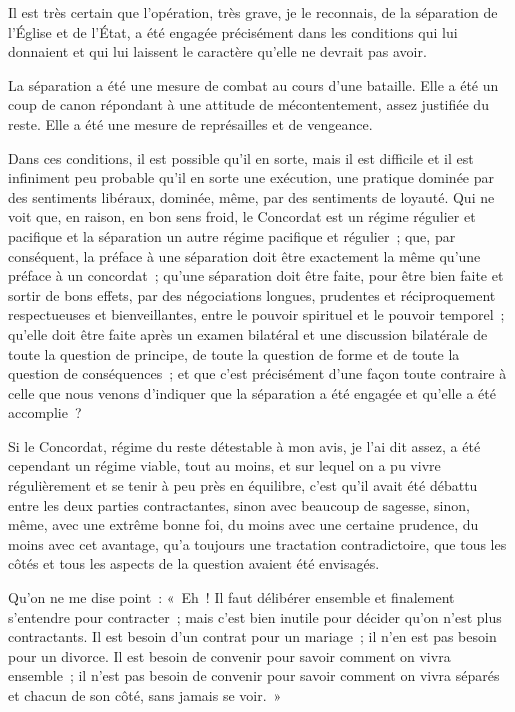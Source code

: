 \documentclass[french,twoside]{book} %
\begin{document}
Il est très certain que l’opération, très grave, je le reconnais, de la séparation de l’Église et de l’État, a été engagée précisément dans les conditions qui lui donnaient et qui lui laissent le caractère qu’elle ne devrait pas avoir.\par
La séparation a été une mesure de combat au cours d’une bataille. Elle a été un coup de canon répondant à une attitude de mécontentement, assez justifiée du reste. Elle a été une mesure de représailles et de vengeance.\par
Dans ces conditions, il est possible qu’il en sorte,  mais il est difficile et il est infiniment peu probable qu’il en sorte une exécution, une pratique dominée par des sentiments libéraux, dominée, même, par des sentiments de loyauté. Qui ne voit que, en raison, en bon sens froid, le Concordat est un régime régulier et pacifique et la séparation un autre régime pacifique et régulier ; que, par conséquent, la préface à une séparation doit être exactement la même qu’une préface à un concordat ; qu’une séparation doit être faite, pour être bien faite et sortir de bons effets, par des négociations longues, prudentes et réciproquement respectueuses et bienveillantes, entre le pouvoir spirituel et le pouvoir temporel ; qu’elle doit être faite après un examen bilatéral et une discussion bilatérale de toute la question de principe, de toute la question de forme et de toute la question de conséquences ; et que c’est précisément d’une façon toute contraire à celle que nous venons d’indiquer que la séparation a été engagée et qu’elle a été accomplie ?\par
Si le Concordat, régime du reste détestable à mon avis, je l’ai dit assez, a été cependant un régime viable, tout au moins, et sur lequel on a pu vivre régulièrement et se tenir à peu près en équilibre, c’est qu’il avait été débattu entre les deux parties contractantes, sinon avec beaucoup de  sagesse, sinon, même, avec une extrême bonne foi, du moins avec une certaine prudence, du moins avec cet avantage, qu’a toujours une tractation contradictoire, que tous les côtés et tous les aspects de la question avaient été envisagés.\par
Qu’on ne me dise point : « Eh ! Il faut délibérer ensemble et finalement s’entendre pour contracter ; mais c’est bien inutile pour décider qu’on n’est plus contractants. Il est besoin d’un contrat pour un mariage ; il n’en est pas besoin pour un divorce. Il est besoin de convenir pour savoir comment on vivra ensemble ; il n’est pas besoin de convenir pour savoir comment on vivra séparés et chacun de son côté, sans jamais se voir. »\par
\end{document}
